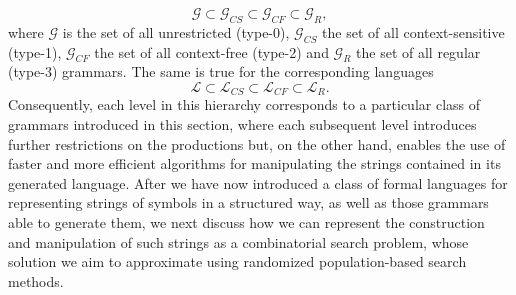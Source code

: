 \begin{equation*}
	\mathcal{G} \subset \mathcal{G}_{CS} \subset \mathcal{G}_{CF} \subset \mathcal{G}_{R}, 
\end{equation*} 
where $\mathcal{G}$ is the set of all unrestricted (type-0), $\mathcal{G}_{CS}$ the set of all context-sensitive (type-1), $\mathcal{G}_{CF}$ the set of all context-free (type-2) and $\mathcal{G}_{R}$ the set of all regular (type-3) grammars.
The same is true for the corresponding languages
\begin{equation*}
	\mathcal{L} \subset \mathcal{L}_{CS} \subset \mathcal{L}_{CF} \subset \mathcal{L}_{R}. 
\end{equation*}
Consequently, each level in this hierarchy corresponds to a particular class of grammars introduced in this section, where each subsequent level introduces further restrictions on the productions but, on the other hand, enables the use of faster and more efficient algorithms for manipulating the strings contained in its generated language.
After we have now introduced a class of formal languages for representing strings of symbols in a structured way, as well as those grammars able to generate them, we next discuss how we can represent the construction and manipulation of such strings as a combinatorial search problem, whose solution we aim to approximate using randomized population-based search methods.
